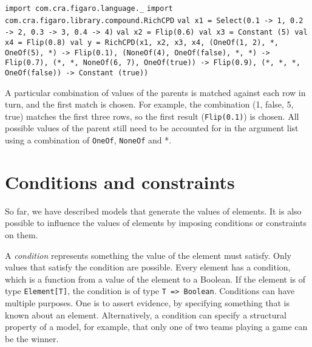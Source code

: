 \begin{flushleft}
\texttt{import com.cra.figaro.language.\_}
\newline \texttt{import com.cra.figaro.library.compound.RichCPD}
\newline \texttt{val x1 = Select(0.1 -> 1, 0.2 -> 2, 0.3 -> 3, 0.4 -> 4)}
\newline \texttt{val x2 = Flip(0.6) 
\newline val x3 = Constant (5) 
\newline val x4 = Flip(0.8)
\newline val y = RichCPD(x1, x2, x3, x4,
\newline \tab (OneOf(1, 2), *, OneOf(5), *) -> Flip(0.1), 
\newline \tab (NoneOf(4), OneOf(false), *, *) -> Flip(0.7), 
\newline \tab (*, *, NoneOf(6, 7), OneOf(true)) -> Flip(0.9), 
\newline \tab (*, *, *, OneOf(false)) -> Constant (true))}
\end{flushleft}

A particular combination of values of the parents is matched against each row in turn, and the first match is chosen. For example, the combination (1, false, 5, true) matches the first three rows, so the first result (\texttt{Flip(0.1)}) is chosen. All possible values of the parent still need to be accounted for in the argument list using a combination of \texttt{OneOf}, \texttt{NoneOf} and *.

\section{Conditions and constraints}

So far, we have described models that generate the values of elements. It is also possible to influence the values of elements by imposing conditions or constraints on them.

A \emph{condition} represents something the value of the element must satisfy. Only values that satisfy the condition are possible. Every element has a condition, which is a function from a value of the element to a Boolean. If the element is of type \texttt{Element[T]}, the condition is of type \texttt{T => Boolean}. Conditions can have multiple purposes. One is to assert evidence, by specifying something that is known about an element. Alternatively, a condition can specify a structural property of a model, for example, that only one of two teams playing a game can be the winner.

